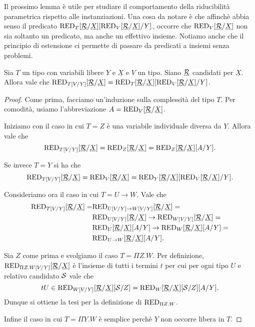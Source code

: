 \documentclass[]{marticle}
\begin{document}
Il prossimo lemma \`e utile per studiare il comportamento della riducibilit\`a
parametrica rispetto alle instanziazioni. Una cosa da notare \`e che affinch\`e
abbia senso il predicato $\text{RED}_{T}[\underline{\mathcal{R}}/\underline{X}] [\text{RED}_{V}[\underline{\mathcal{R}}/\underline{X}]/Y]$, occorre che
$\text{RED}_{V}[\underline{\mathcal{R}}/\underline{X}]$ non sia soltanto un predicato, ma anche un effettivo insieme.
Notiamo anche che il principio di estensione ci permette di passare da predicati
a insiemi senza problemi.
\begin{block} [Lemmma]
    Sia $T$ un tipo con variabili libere $Y$ e $\underline{X}$ e $V$ un tipo.
    Siano $\underline{\mathcal{R}}$ candidati per $\underline{X}$. Allora vale che
    $\text{RED}_{T[V/Y]}[\underline{\mathcal{R}}/\underline{X}]= \text{RED}_{T}[\underline{\mathcal{R}}/\underline{X}] [\text{RED}_{V}[\underline{\mathcal{R}}/\underline{X}]/Y]$.
\end{block}
\begin{proof}
    Come prima, facciamo un'induzione sulla complessit\`a del tipo $T$. Per
    comodit\`a, usiamo l'abbreviazione $A=\text{RED}_{V}[\underline{\mathcal{R}}/\underline{X}]$.

    Iniziamo con il caso in cui $T=Z$ \`e una variabile individuale diversa da
    $Y$. Allora vale che 
    \[
        \text{RED}_{T[V/Y]}[\underline{\mathcal{R}}/\underline{X}] = \text{RED}_{Z}[\underline{\mathcal{R}}/\underline{X}] = \text{RED}_{Z}[\underline{\mathcal{R}}/\underline{X}][A/Y].
    \]

    Se invece $T=Y$ si ha che
    \[
        \text{RED}_{T[V/Y]}[\underline{\mathcal{R}}/\underline{X}] = \text{RED}_{V}[\underline{\mathcal{R}}/\underline{X}] = \text{RED}_{Y}[\underline{\mathcal{R}}/\underline{X}][
            \text{RED}_{V}[\underline{\mathcal{R}}/\underline{X}]/Y].
    \]

    Consideriamo ora il caso in cui $T=U\rightarrow W$. Vale che
    \begin{align*}
        \text{RED}_{T[V/Y]}[\underline{\mathcal{R}}/\underline{X}] = 
        &\text{RED}_{U[V/Y]\rightarrow W[V/Y]}[\underline{\mathcal{R}}/\underline{X}] =  \\
        &\text{RED}_{U[V/Y]}[\underline{\mathcal{R}}/\underline{X}] \rightarrow \text{RED}_{W[V/Y]}[\underline{\mathcal{R}}/\underline{X}]= \\
        &\text{RED}_{U}[\underline{\mathcal{R}}/\underline{X}][A/Y] \rightarrow\text{RED}_{W}[\underline{\mathcal{R}}/\underline{X}][A/Y] = \\
        &\text{RED}_{U\rightarrow W}[\underline{\mathcal{R}}/\underline{X}][A/Y].
    \end{align*}

    Sia $Z$ come prima e svolgiamo il caso $T=\Pi Z. W$. Per definizione,
    $\text{RED}_{\Pi Z. W[V/Y]}[\underline{\mathcal{R}}/\underline{X}]$ \`e l'insieme di tutti i termini $t$ per
    cui per ogni tipo $U$ e relativo candidato $\mathcal{S}$ vale che
    \[
        tU\in \text{RED}_{W[V/Y]}[\underline{\mathcal{R}}/\underline{X}][\mathcal{S}/Z] = 
        \text{RED}_{W}[\underline{\mathcal{R}}/\underline{X}][\mathcal{S}/Z][A/Y].
    \]
    Dunque si ottiene la tesi per la definizione di $\text{RED}_{\Pi Z.W}$.

    Infine il caso in cui $T=\Pi Y.W$ \`e semplice perch\`e $Y$ non occorre
    libera in $T$.
\end{proof}
\end{document}
